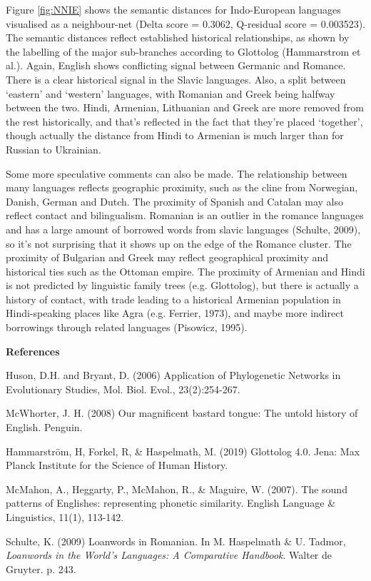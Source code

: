 \documentclass[notitlepage]{report}
\begin{document}
Figure \ref{fig:NNIE} shows the semantic distances for Indo-European languages visualised as a neighbour-net (Delta score = 0.3062, Q-residual score = 0.003523). The semantic distances reflect established historical relationships, as shown by the labelling of the major sub-branches according to Glottolog (Hammarstrom et al.). Again, English shows conflicting signal between Germanic and Romance. There is a clear historical signal in the Slavic languages. Also, a split between `eastern' and `western' languages, with Romanian and Greek being halfway between the two.  Hindi, Armenian, Lithuanian and Greek are more removed from the rest historically, and that's reflected in the fact that they're placed `together', though actually the distance from Hindi to Armenian is much larger than for Russian to Ukrainian.

Some more speculative comments can also be made. The relationship between many languages reflects geographic proximity, such as the cline from Norwegian, Danish, German and Dutch. The proximity of Spanish and Catalan may also reflect contact and bilingualism. Romanian is an outlier in the romance languages and has a large amount of borrowed words from slavic languages (Schulte, 2009), so it's not surprising that it shows up on the edge of the Romance cluster. The proximity of Bulgarian and Greek may reflect geographical proximity and historical ties such as the Ottoman empire. The proximity of Armenian and Hindi is not predicted by linguistic family trees (e.g. Glottolog), but there is actually a history of contact, with trade leading to a historical Armenian population in Hindi-speaking places like Agra (e.g. Ferrier, 1973), and maybe more indirect borrowings through related languages (Pisowicz, 1995). 

\noindent
\textbf{References}

Huson, D.H. and Bryant, D. (2006) Application of Phylogenetic Networks in Evolutionary Studies, Mol. Biol. Evol., 23(2):254-267.

McWhorter, J. H. (2008) Our magnificent bastard tongue: The untold history of English. Penguin.

Hammarstr\"{o}m, H, Forkel, R, \& Haspelmath, M. (2019) Glottolog 4.0. Jena: Max Planck Institute for the Science of Human History.

McMahon, A., Heggarty, P., McMahon, R., \& Maguire, W. (2007). The sound patterns of Englishes: representing phonetic similarity. English Language \& Linguistics, 11(1), 113-142. 

Schulte, K. (2009) Loanwords in Romanian. In M. Haspelmath \& U. Tadmor, \emph{Loanwords in the World's Languages: A Comparative Handbook}. Walter de Gruyter. p. 243.
\end{document}
